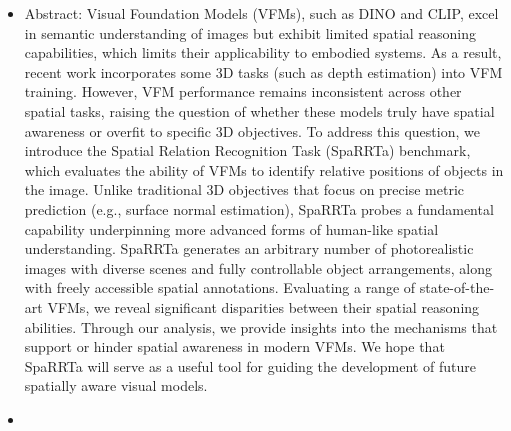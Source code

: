 \begin{itemize}
    \item \textbf{}
    
    Abstract:
    Visual Foundation Models (VFMs), such as DINO and CLIP, excel in semantic understanding of images but exhibit limited spatial reasoning capabilities, which limits their applicability to embodied systems. As a result, recent work incorporates some 3D tasks (such as depth estimation) into VFM training. However, VFM performance remains inconsistent across other spatial tasks, raising the question of whether these models truly have spatial awareness or overfit to specific 3D objectives. To address this question, we introduce the Spatial Relation Recognition Task (SpaRRTa) benchmark, which evaluates the ability of VFMs to identify relative positions of objects in the image. Unlike traditional 3D objectives that focus on precise metric prediction (e.g., surface normal estimation), SpaRRTa probes a fundamental capability underpinning more advanced forms of human-like spatial understanding. SpaRRTa generates an arbitrary number of photorealistic images with diverse scenes and fully controllable object arrangements, along with freely accessible spatial annotations. Evaluating a range of state-of-the-art VFMs, we reveal significant disparities between their spatial reasoning abilities. Through our analysis, we provide insights into the mechanisms that support or hinder spatial awareness in modern VFMs. We hope that SpaRRTa will serve as a useful tool for guiding the development of future spatially aware visual models.
    \item \textbf{}
    

\end{itemize}
